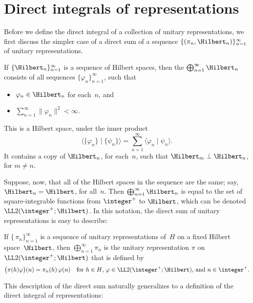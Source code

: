 \section{Direct integrals of representations} \label{DirectIntegralSect}

Before we define the direct integral of a collection of unitary representations, we first discuss the simpler case of a direct sum of a sequence $\{(\pi_n, \Hilbert_n)\}_{n= 1}^\infty$ of unitary representations.

\begin{defn} \label{HilbertDirSumInfty}
If $\{\Hilbert_n \}_{n=1}^\infty$ is a sequence of Hilbert spaces, then the  $\bigoplus_{n= 1}^\infty \Hilbert_n$ consists of all sequences $\{\varphi_n\}_{n= 1}^\infty$, such that 
	\begin{itemize}
	\item $\varphi_n \in \Hilbert_n$ for each~$n$, 
	and
	\item $\sum_{n= 1}^\infty \| \varphi_n\|^2 < \infty$.
	\end{itemize}
This is a Hilbert space, under the inner product 
	$$ \bigl\langle \{\varphi_n\} \mid \{\psi_n\} \bigr\rangle = \sum_{n= 1}^\infty \langle \varphi_n \mid \psi_n \rangle .$$
It contains a copy of $\Hilbert_n$, for each~$n$, such that $\Hilbert_m \perp \Hilbert_n$, for $m \neq n$.
\end{defn}

Suppose, now, that all of the Hilbert spaces in the sequence are the same; say, $\Hilbert_n = \Hilbert$, for all~$n$. Then $\bigoplus_{n=1}^\infty \Hilbert_n$ is equal to the set of square-integrable functions from $\integer^+$ to $\Hilbert$, which can be denoted $\LL2(\integer^+ ; \Hilbert)$. In this notation, the direct sum of unitary representations is easy to describe:

\begin{defn}
If $\{\, \pi_n\}_{n= 1}^\infty$ is a sequence of unitary representations of~$H$ on a fixed Hilbert space~$\Hilbert$, then $\bigoplus_{n= 1}^\infty \pi_n$ is the unitary representation $\pi$ on $\LL2(\integer^+ ; \Hilbert)$ that is defined by
	$$ \bigl( \pi(h) \varphi  \bigr)(n) = \pi_n(h) \, \varphi(n)
	 \quad \text{for $h \in H$, $\varphi \in \LL2(\integer^+ ; \Hilbert)$, and $n \in \integer^+$} .$$
\end{defn}

This description of the direct sum naturally generalizes to a definition of the direct integral of representations:

